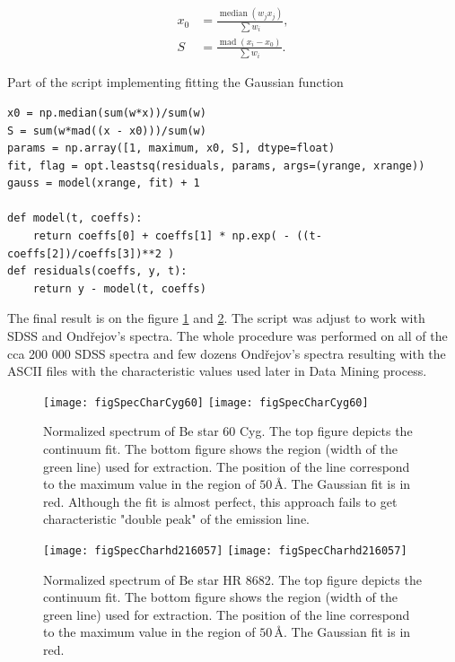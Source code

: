 \begin{align}
  x_0 & = \frac{\operatorname{median}(w_jx_j)}{\sum{w_i}}, \\
  S & = \frac{\operatorname{mad}(x_i - x_0)}{\sum{w_i}}.
\end{align}

\citep{launer1979robustness}

Part of the script implementing fitting the Gaussian function

\begin{lstlisting}
x0 = np.median(sum(w*x))/sum(w)
S = sum(w*mad((x - x0)))/sum(w)
params = np.array([1, maximum, x0, S], dtype=float)
fit, flag = opt.leastsq(residuals, params, args=(yrange, xrange))
gauss = model(xrange, fit) + 1

def model(t, coeffs):
    return coeffs[0] + coeffs[1] * np.exp( - ((t-coeffs[2])/coeffs[3])**2 )
def residuals(coeffs, y, t):
    return y - model(t, coeffs)
\end{lstlisting}

The final result is on the figure \ref{FigSpecChar1} and
\ref{FigSpecChar2}. The script was adjust to work with SDSS and
Ondřejov's spectra. The whole procedure was performed on all of the
cca 200 000 SDSS spectra and few dozens Ondřejov's spectra resulting
with the ASCII files with the characteristic values used later in Data
Mining process.

   \begin{figure}[!htbp]
      \begin{center}
        \leavevmode
        \ifpdf
        \texttt{[image: figSpecCharCyg60]}
        \else
        \texttt{[image: figSpecCharCyg60]}
        \fi
        \caption{Normalized spectrum of Be star 60 Cyg. The top figure
          depicts the continuum fit. The bottom figure shows the
          region (width of the green line) used for extraction. The
          position of the line correspond to the maximum value in the
          region of $50\,\textrm{\AA}$. The Gaussian fit is in red. Although the
          fit is almost perfect, this approach fails to get
          characteristic "double peak" of the emission line. }
        \label{FigSpecChar1}
      \end{center}
    \end{figure}

   \begin{figure}[!htbp]
      \begin{center}
        \leavevmode
        \ifpdf
        \texttt{[image: figSpecCharhd216057]}
        \else
        \texttt{[image: figSpecCharhd216057]}
        \fi
        \caption{Normalized spectrum of Be star HR 8682. The top
          figure depicts the continuum fit. The bottom figure shows
          the region (width of the green line) used for
          extraction. The position of the line correspond to the
          maximum value in the region of $50\,\textrm{\AA}$. The Gaussian fit is
          in red.}
        \label{FigSpecChar2}
      \end{center}
    \end{figure}


